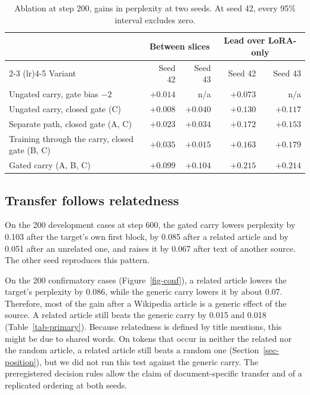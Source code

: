 \documentclass[12pt,a4paper]{report}
\begin{document}
\begin{table}[H]
  \centering
  \small
  \begin{tabular}{lrrrr}
    \toprule
    & \multicolumn{2}{c}{Between slices} & \multicolumn{2}{c}{Lead over LoRA-only} \\
    \cmidrule(lr){2-3} \cmidrule(lr){4-5}
    Variant & Seed 42 & Seed 43 & Seed 42 & Seed 43 \\
    \midrule
    Ungated carry, gate bias $-2$ & $+0.014$ & n/a & $+0.073$ & n/a \\
    Ungated carry, closed gate (C) & $+0.008$ & $+0.040$ & $+0.130$ & $+0.117$ \\
    Separate path, closed gate (A, C) & $+0.023$ & $+0.034$ & $+0.172$ & $+0.153$ \\
    Training through the carry, closed gate (B, C) & $+0.035$ & $+0.015$ & $+0.163$ & $+0.179$ \\
    Gated carry (A, B, C) & $+0.099$ & $+0.104$ & $+0.215$ & $+0.214$ \\
    \bottomrule
  \end{tabular}
    \caption{Ablation at step 200, gains in perplexity at two seeds. At seed 42, every 95\% interval excludes zero.}
  \label{tab-ablation}
\end{table}

\subsection{Transfer follows relatedness}
\label{sec-transfer}

On the 200 development cases at step 600, the gated carry lowers perplexity by 0.103 after the target's own first block, by 0.085 after a related article and by 0.051 after an unrelated one, and raises it by 0.067 after text of another source. The other seed reproduces this pattern.

On the 200 confirmatory cases (Figure~\ref{fig-conf}), a related article lowers the target's perplexity by 0.086, while the generic carry lowers it by about 0.07. Therefore, most of the gain after a Wikipedia article is a generic effect of the source. A related article still beats the generic carry by 0.015 and 0.018 (Table~\ref{tab-primary}). Because relatedness is defined by title mentions, this might be due to shared words. On tokens that occur in neither the related nor the random article, a related article still beats a random one (Section~\ref{sec-position}), but we did not run this test against the generic carry. The preregistered decision rules allow the claim of document-specific transfer and of a replicated ordering at both seeds.
\end{document}
